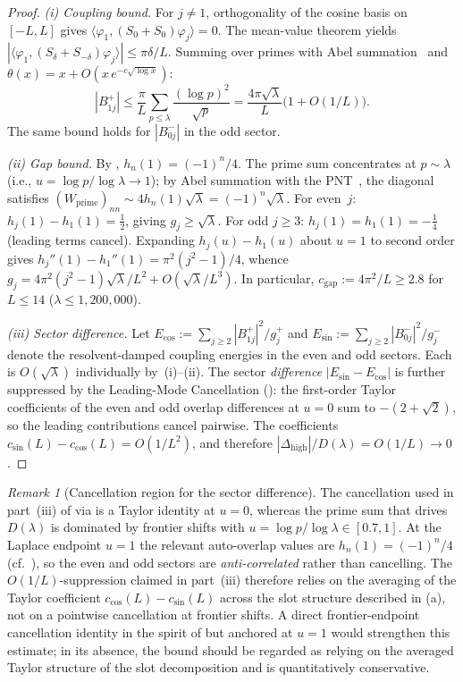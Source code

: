 \documentclass[11pt,a4paper]{article}
\theoremstyle{remark}
\newtheorem{remark}[remark]{Remark}
\theoremstyle{plain}
\begin{document}
\begin{proof}
\emph{(i) Coupling bound.} For $j\neq 1$, orthogonality of the cosine basis on
$[-L,L]$ gives $\langle\varphi_1,(S_0+S_0)\varphi_j\rangle=0$. The mean-value
theorem yields $|\langle\varphi_1,(S_\delta+S_{-\delta})\varphi_j\rangle|\leq\pi\delta/L$.
Summing over primes with Abel summation~\cite{IwaniecKowalski2004} and
$\theta(x)=x+O(x\,e^{-c\sqrt{\log x}})$:
\[
  |B_{1j}^+|\leq\frac{\pi}{L}\sum_{p\leq\lambda}\frac{(\log p)^2}{\sqrt p}
  =\frac{4\pi\sqrt\lambda}{L}\bigl(1+O(1/L)\bigr).
\]
The same bound holds for $|B_{0j}^-|$ in the odd sector.

\emph{(ii) Gap bound.} By , $h_n(1)=(-1)^n/4$.
The prime sum concentrates at $p\sim\lambda$ (i.e., $u=\log p/\log\lambda\to 1$);
by Abel summation with the PNT~\cite{IwaniecKowalski2004}, the diagonal satisfies
$(W_{\mathrm{prime}})_{nn}\sim 4h_n(1)\sqrt\lambda=(-1)^n\sqrt\lambda$.
For even~$j$: $h_j(1)-h_1(1)=\tfrac12$, giving $g_j\geq\sqrt\lambda$.
For odd $j\geq 3$: $h_j(1)=h_1(1)=-\tfrac14$ (leading terms cancel).
Expanding $h_j(u)-h_1(u)$ about $u=1$ to second order gives
$h_j''(1)-h_1''(1)=\pi^2(j^2-1)/4$, whence
$g_j=4\pi^2(j^2-1)\sqrt\lambda/L^2+O(\sqrt\lambda/L^3)$.
In particular, $c_{\mathrm{gap}}:=4\pi^2/L\geq 2.8$ for $L\leq 14$ ($\lambda\leq 1{,}200{,}000$).

\emph{(iii) Sector difference.} Let
$E_{\cos}:=\sum_{j\geq 2}|B_{1j}^+|^2/g_j^+$ and
$E_{\sin}:=\sum_{j\geq 2}|B_{0j}^-|^2/g_j^-$
denote the resolvent-damped coupling energies in the even and odd sectors.
Each is $O(\sqrt\lambda)$ individually by~(i)--(ii). The sector
\emph{difference} $|E_{\sin}-E_{\cos}|$ is further suppressed by the Leading-Mode
Cancellation (): the first-order Taylor coefficients of
the even and odd overlap differences at $u=0$ sum to $-(2+\sqrt{2})$, so the
leading contributions cancel pairwise. The coefficients
$c_{\sin}(L)-c_{\cos}(L)=O(1/L^2)$, and therefore
$|\Delta_{\mathrm{high}}|/D(\lambda)=O(1/L)\to 0$.
\end{proof}

\begin{remark}[Cancellation region for the sector difference]
\label{rem:leading-cancellation-region}
The cancellation used in part~(iii) of  via
 is a Taylor identity at $u=0$, whereas the prime
sum that drives $D(\lambda)$ is dominated by frontier shifts with
$u=\log p/\log\lambda\in[0.7,1]$. At the Laplace endpoint $u=1$ the relevant
auto-overlap values are $h_n(1)=(-1)^n/4$ (cf.\ ), so
the even and odd sectors are \emph{anti-correlated} rather than cancelling.
The $O(1/L)$-suppression claimed in part~(iii) therefore relies on the
averaging of the Taylor coefficient $c_{\cos}(L)-c_{\sin}(L)$ across the
slot structure described in (a), not on a pointwise
cancellation at frontier shifts. A direct frontier-endpoint cancellation
identity in the spirit of  but anchored at $u=1$
would strengthen this estimate; in its absence, the bound should be regarded
as relying on the averaged Taylor structure of the slot decomposition and is
quantitatively conservative.
\end{remark}
\end{document}
